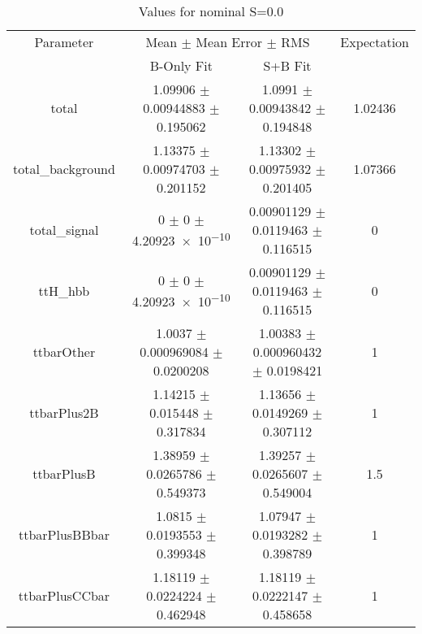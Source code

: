 \begin{table}
\centering
\caption{Values for nominal S=0.0}
\begin{tabular}{cccc}
\toprule
Parameter & \multicolumn{2}{c}{Mean $\pm$ Mean Error $\pm$ RMS} & Expectation\\
 & B-Only Fit & S+B Fit & \\
\midrule
total & \num{1.09906} $\pm$ \num{0.00944883} $\pm$ \num{0.195062} & \num{1.0991} $\pm$ \num{0.00943842} $\pm$ \num{0.194848} & \num{1.02436}\\
total\_background & \num{1.13375} $\pm$ \num{0.00974703} $\pm$ \num{0.201152} & \num{1.13302} $\pm$ \num{0.00975932} $\pm$ \num{0.201405} & \num{1.07366}\\
total\_signal & \num{0} $\pm$ \num{0} $\pm$ \num{4.20923e-10} & \num{0.00901129} $\pm$ \num{0.0119463} $\pm$ \num{0.116515} & \num{0}\\
ttH\_hbb & \num{0} $\pm$ \num{0} $\pm$ \num{4.20923e-10} & \num{0.00901129} $\pm$ \num{0.0119463} $\pm$ \num{0.116515} & \num{0}\\
ttbarOther & \num{1.0037} $\pm$ \num{0.000969084} $\pm$ \num{0.0200208} & \num{1.00383} $\pm$ \num{0.000960432} $\pm$ \num{0.0198421} & \num{1}\\
ttbarPlus2B & \num{1.14215} $\pm$ \num{0.015448} $\pm$ \num{0.317834} & \num{1.13656} $\pm$ \num{0.0149269} $\pm$ \num{0.307112} & \num{1}\\
ttbarPlusB & \num{1.38959} $\pm$ \num{0.0265786} $\pm$ \num{0.549373} & \num{1.39257} $\pm$ \num{0.0265607} $\pm$ \num{0.549004} & \num{1.5}\\
ttbarPlusBBbar & \num{1.0815} $\pm$ \num{0.0193553} $\pm$ \num{0.399348} & \num{1.07947} $\pm$ \num{0.0193282} $\pm$ \num{0.398789} & \num{1}\\
ttbarPlusCCbar & \num{1.18119} $\pm$ \num{0.0224224} $\pm$ \num{0.462948} & \num{1.18119} $\pm$ \num{0.0222147} $\pm$ \num{0.458658} & \num{1}\\
\bottomrule
\end{tabular}
\end{table}